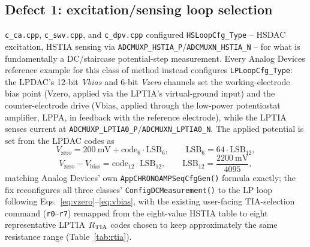 \subsection{Defect 1: excitation/sensing loop selection}
\label{sec:rootcause}
\texttt{c\_ca.cpp}, \texttt{c\_swv.cpp}, and \texttt{c\_dpv.cpp} configured
\texttt{HSLoopCfg\_Type} -- HSDAC excitation, HSTIA sensing via
\texttt{ADCMUXP\_HSTIA\_P}/\texttt{ADCMUXN\_HSTIA\_N} -- for what is
fundamentally a DC/staircase potential-step measurement. Every Analog
Devices reference example for this class of method instead configures
\texttt{LPLoopCfg\_Type}: the LPDAC's 12-bit \emph{Vbias} and 6-bit
\emph{Vzero} channels set the working-electrode bias point (Vzero, applied
via the LPTIA's virtual-ground input) and the counter-electrode drive
(Vbias, applied through the low-power potentiostat amplifier, LPPA, in
feedback with the reference electrode), while the LPTIA senses current at
\texttt{ADCMUXP\_LPTIA0\_P}/\texttt{ADCMUXN\_LPTIA0\_N}. The applied
potential is set from the LPDAC codes as
\begin{equation}
V_{\mathrm{zero}} = \SI{200}{\milli\volt} + \mathrm{code}_{6}\cdot\mathrm{LSB}_{6},
\qquad \mathrm{LSB}_{6} = 64\cdot\mathrm{LSB}_{12},
\label{eq:vzero}
\end{equation}
\begin{equation}
V_{\mathrm{zero}} - V_{\mathrm{bias}} = \mathrm{code}_{12}\cdot\mathrm{LSB}_{12},
\qquad \mathrm{LSB}_{12} = \frac{\SI{2200}{\milli\volt}}{4095},
\label{eq:vbias}
\end{equation}
matching Analog Devices' own \texttt{AppCHRONOAMPSeqCfgGen()} formula
exactly; the fix reconfigures all three classes' \texttt{ConfigDCMeasurement()}
to the LP loop following Eqs.~\eqref{eq:vzero}--\eqref{eq:vbias}, with the
existing user-facing TIA-selection command (\texttt{r0}--\texttt{r7})
remapped from the eight-value HSTIA table to eight representative LPTIA
$R_{\mathrm{TIA}}$ codes chosen to keep approximately the same resistance range
(Table~\ref{tab:rtia}).

